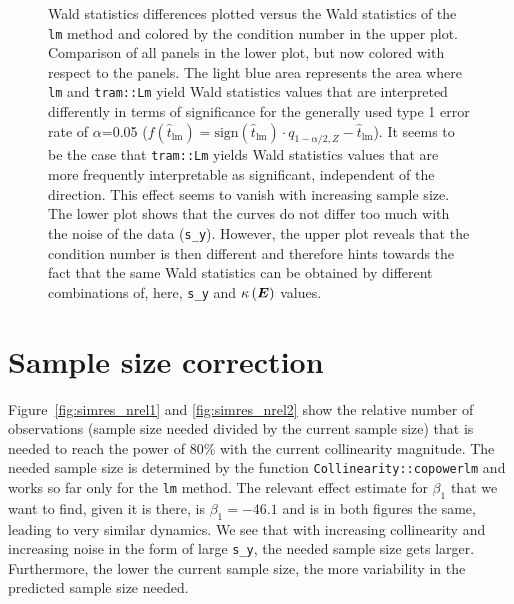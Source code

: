 \documentclass[11pt,a4paper,twoside]{book}\usepackage[]{graphicx}\usepackage[]{xcolor}
\begin{document}
\begin{figure}[H]
\caption{Wald statistics differences plotted versus the Wald statistics of the \texttt{lm} method and colored by the condition number in the upper plot. Comparison of all panels in the lower plot, but now colored with respect to the panels. The light blue area represents the area where \texttt{lm} and \texttt{tram::Lm} yield Wald statistics values that are interpreted differently in terms of significance for the generally used type 1 error rate of $\alpha$=0.05 ($f(\hat{t}_\text{lm})=\text{sign}(\hat{t}_\text{lm})\cdot q_{1-\alpha/2,Z} -\hat{t}_\text{lm}$). It seems to be the case that \texttt{tram::Lm} yields Wald statistics values that are more frequently interpretable as significant, independent of the direction. This effect seems to vanish with increasing sample size. The lower plot shows that the curves do not differ too much with the noise of the data (\texttt{s\_y}). However, the upper plot reveals that the condition number is then different and therefore hints towards the fact that the same Wald statistics can be obtained by different combinations of, here, \texttt{s\_y} and $\kappa\left({\boldsymbol{E}}\right)$ values. }
\label{fig:simres_differencevslm2}
\end{figure}


\newpage
\section{Sample size correction}
Figure~\ref{fig:simres_nrel1} and \ref{fig:simres_nrel2} show the relative number of observations (sample size needed divided by the current sample size) that is needed to reach the power of 80\% with the current collinearity magnitude. The needed sample size is determined by the function \texttt{Collinearity::copowerlm} and works so far only for the \texttt{lm} method. The relevant effect estimate for $\beta_1$ that we want to find, given it is there, is $\beta_1=-46.1$ and is in both figures the same, leading to very similar dynamics. We see that with increasing collinearity and increasing noise in the form of large \texttt{s\_y}, the needed sample size gets larger. Furthermore, the lower the current sample size, the more variability in the predicted sample size needed.

\newpage
\end{document}
